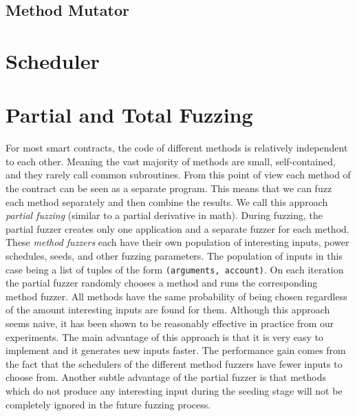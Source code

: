 \subsection*{Method Mutator}


\section{Scheduler}

\section{Partial and Total Fuzzing}
For most smart contracts, the code of different methods is relatively independent to each other.
Meaning the vast majority of methods are small, self-contained, and they rarely call common subroutines.
From this point of view each method of the contract can be seen as a separate program.
This means that we can fuzz each method separately and then combine the results.
We call this approach \textit{partial fuzzing} (similar to a partial derivative in math).
During fuzzing, the partial fuzzer creates only one application and a separate fuzzer for each method.
These \textit{method fuzzers} each have their own population of interesting inputs, power schedules, seeds, and other fuzzing parameters.
The population of inputs in this case being a list of tuples of the form \texttt{(arguments, account)}.
On each iteration the partial fuzzer randomly chooses a method and runs the corresponding method fuzzer.
All methods have the same probability of being chosen regardless of the amount interesting inputs are found for them.
Although this approach seems naive, it has been shown to be reasonably effective in practice from our experiments.
The main advantage of this approach is that it is very easy to implement and it generates new inputs faster.
The performance gain comes from the fact that the schedulers of the different method fuzzers have fewer inputs to choose from.
Another subtle advantage of the partial fuzzer is that methods which do not produce any interesting input during the seeding stage will not be completely ignored in the future fuzzing process.

